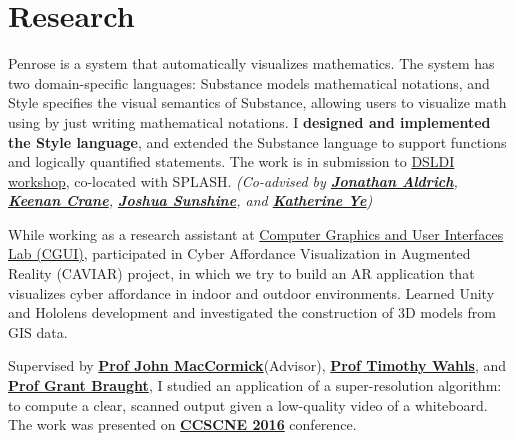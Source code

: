\documentclass[]{deedy-resume-openfont}
\begin{document}
\begin{minipage}[t]{0.66\textwidth}



\section{Research}
    Penrose is a system that automatically visualizes mathematics.  The system has two domain-specific languages: Substance models mathematical notations, and Style specifies the visual semantics of Substance, allowing users to visualize math using by just writing mathematical notations. I \textbf{designed and implemented the Style language}, and extended the Substance language to support functions and logically quantified statements. The work is in submission to \href{http://2017.splashcon.org/track/dsldi-2017}{DSLDI workshop}, co-located with SPLASH. \textit{(Co-advised by \textbf{\href{https://www.cs.cmu.edu/~./aldrich/}{Jonathan Aldrich}}, \textbf{\href{https://www.cs.cmu.edu/~kmcrane/}{Keenan Crane}}, \textbf{\href{http://www.cs.cmu.edu/~jssunshi/}{Joshua Sunshine}}, and \textbf{\href{https://www.cs.cmu.edu/~kqy/}{Katherine Ye}})}

\sectionsep

While working as a research assistant at \href{http://graphics.cs.columbia.edu/kenny/home/home/}{Computer Graphics and User Interfaces Lab (CGUI)}, participated in Cyber Affordance Visualization in Augmented Reality (CAVIAR) project, in which we try to build an AR application that visualizes cyber affordance in indoor and outdoor environments. Learned Unity and Hololens development and investigated the construction of 3D models from GIS data.
\sectionsep

 Supervised by \textbf{\href{http://users.dickinson.edu/~jmac/}{Prof John MacCormick}}(Advisor), \textbf{\href{http://users.dickinson.edu/~wahlst/}{Prof Timothy Wahls}}, and \textbf{\href{http://users.dickinson.edu/~braught/?}{Prof Grant Braught}}, I studied an application of a super-resolution algorithm: to compute a clear, scanned output given a low-quality video of a whiteboard. The work was presented on \textbf{\href{http://ccscne.org/conferences/ccscne-2016/}{CCSCNE 2016}} conference.
\sectionsep



\end{minipage}
\end{document}
